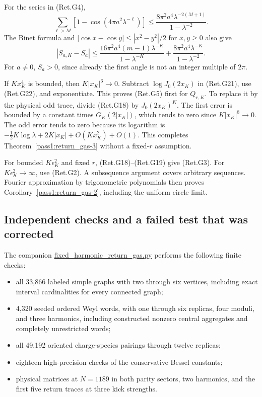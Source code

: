 For the series in (Ret.G4),
\[
 \sum_{\ell>M}[1-\cos(4\pi a^2\lambda^{-\ell})]
 \le\frac{8\pi^2a^4\lambda^{-2(M+1)}}{1-\lambda^{-2}}.
\]
The Binet formula and \(|\cos x-\cos y|\le|x^2-y^2|/2\) for \(x,y\ge0\)
also give
\[
 |S_{a,K}-S_a|
 \le\frac{16\pi^2a^4(m-1)\lambda^{-K}}{1-\lambda^{-K}}
             +\frac{8\pi^2a^4\lambda^{-K}}{1-\lambda^{-2}}. \tag{Ret.G22}
\]
For \(a\ne0\), \(S_a>0\), since already the first angle is not an integer
multiple of \(2\pi\).

If \(Kx_K^4\) is bounded, then \(K|x_K|^6\to0\).
Subtract \(\log J_0(2x_K)\) in (Ret.G21), use (Ret.G22), and exponentiate.
This proves (Ret.G5) first for \(Q_{r,K}\).
To replace it by the physical odd trace, divide (Ret.G18) by
\(J_0(2x_K)^K\).
The first error is bounded by a constant times \(G_K(2|x_K|)\),
which tends to zero since \(K|x_K|^8\to0\).
The odd error tends to zero because its logarithm is
\(-\tfrac12K\log\lambda+2K|x_K|+O(Kx_K^2)+O(1)\).
This completes Theorem~\ref{pass1:return_gas-3} without a fixed-\(r\) assumption.

For bounded \(K\epsilon_K^2\) and fixed \(r\), (Ret.G18)--(Ret.G19) give (Ret.G3).
For \(K\epsilon_K^2\to\infty\), use (Ret.G2).
A subsequence argument covers arbitrary sequences.
Fourier approximation by trigonometric polynomials then proves
Corollary~\ref{pass1:return_gas-2}, including the uniform circle limit.

\hypertarget{independent-checks-and-a-failed-test-that-was-corrected}{%
\subsection{Independent checks and a failed test that was corrected}\label{independent-checks-and-a-failed-test-that-was-corrected}}

The companion
\href{https://github.com/ChurilovMaksim/BGS/blob/main/computations/verification/fixed_harmonic_return_gas.py}{fixed\_harmonic\_return\_gas.py}
performs the following finite checks:

\begin{itemize}
\tightlist
\item
  all 33,866 labeled simple graphs with two through six vertices,
  including exact interval cardinalities for every connected graph;
\item
  4,320 seeded ordered Weyl words, with one through six replicas,
  four moduli, and three harmonics, including constructed nonzero central
  aggregates and completely unrestricted words;
\item
  all 49,192 oriented charge-species pairings through twelve replicas;
\item
  eighteen high-precision checks of the conservative Bessel constants;
\item
  physical matrices at \(N=1189\) in both parity sectors, two harmonics,
  and the first five return traces at three kick strengths.
\end{itemize}

